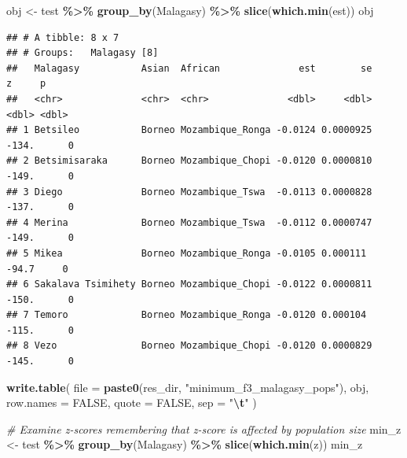 \documentclass[
]{article}
\newenvironment{Shaded}{\begin{snugshade}}{\end{snugshade}}
\newcommand{\AttributeTok}[1]{\textcolor[rgb]{0.13,0.29,0.53}{#1}}
\newcommand{\CommentTok}[1]{\textcolor[rgb]{0.56,0.35,0.01}{\textit{#1}}}
\newcommand{\ConstantTok}[1]{\textcolor[rgb]{0.56,0.35,0.01}{#1}}
\newcommand{\FunctionTok}[1]{\textcolor[rgb]{0.13,0.29,0.53}{\textbf{#1}}}
\newcommand{\NormalTok}[1]{#1}
\newcommand{\OtherTok}[1]{\textcolor[rgb]{0.56,0.35,0.01}{#1}}
\newcommand{\SpecialCharTok}[1]{\textcolor[rgb]{0.81,0.36,0.00}{\textbf{#1}}}
\newcommand{\StringTok}[1]{\textcolor[rgb]{0.31,0.60,0.02}{#1}}
\begin{document}
\begin{Shaded}
\begin{Highlighting}[]
\NormalTok{obj }\OtherTok{\textless{}{-}}\NormalTok{ test }\SpecialCharTok{\%\textgreater{}\%}
  \FunctionTok{group\_by}\NormalTok{(Malagasy) }\SpecialCharTok{\%\textgreater{}\%}
  \FunctionTok{slice}\NormalTok{(}\FunctionTok{which.min}\NormalTok{(est))}
\NormalTok{obj}
\end{Highlighting}
\end{Shaded}

\begin{verbatim}
## # A tibble: 8 x 7
## # Groups:   Malagasy [8]
##   Malagasy           Asian  African              est        se      z     p
##   <chr>              <chr>  <chr>              <dbl>     <dbl>  <dbl> <dbl>
## 1 Betsileo           Borneo Mozambique_Ronga -0.0124 0.0000925 -134.      0
## 2 Betsimisaraka      Borneo Mozambique_Chopi -0.0120 0.0000810 -149.      0
## 3 Diego              Borneo Mozambique_Tswa  -0.0113 0.0000828 -137.      0
## 4 Merina             Borneo Mozambique_Tswa  -0.0112 0.0000747 -149.      0
## 5 Mikea              Borneo Mozambique_Ronga -0.0105 0.000111   -94.7     0
## 6 Sakalava Tsimihety Borneo Mozambique_Chopi -0.0122 0.0000811 -150.      0
## 7 Temoro             Borneo Mozambique_Ronga -0.0120 0.000104  -115.      0
## 8 Vezo               Borneo Mozambique_Chopi -0.0120 0.0000829 -145.      0
\end{verbatim}

\begin{Shaded}
\begin{Highlighting}[]
\FunctionTok{write.table}\NormalTok{(}
  \AttributeTok{file =} \FunctionTok{paste0}\NormalTok{(res\_dir, }\StringTok{"minimum\_f3\_malagasy\_pops"}\NormalTok{),}
\NormalTok{  obj, }\AttributeTok{row.names =} \ConstantTok{FALSE}\NormalTok{, }\AttributeTok{quote =} \ConstantTok{FALSE}\NormalTok{, }\AttributeTok{sep =} \StringTok{"}\SpecialCharTok{\textbackslash{}t}\StringTok{"}
\NormalTok{)}
\end{Highlighting}
\end{Shaded}

\begin{Shaded}
\begin{Highlighting}[]
\CommentTok{\# Examine z{-}scores remembering that z{-}score is affected by population size}
\NormalTok{min\_z }\OtherTok{\textless{}{-}}\NormalTok{ test }\SpecialCharTok{\%\textgreater{}\%}
  \FunctionTok{group\_by}\NormalTok{(Malagasy) }\SpecialCharTok{\%\textgreater{}\%}
  \FunctionTok{slice}\NormalTok{(}\FunctionTok{which.min}\NormalTok{(z))}
\NormalTok{min\_z}
\end{Highlighting}
\end{Shaded}
\end{document}
